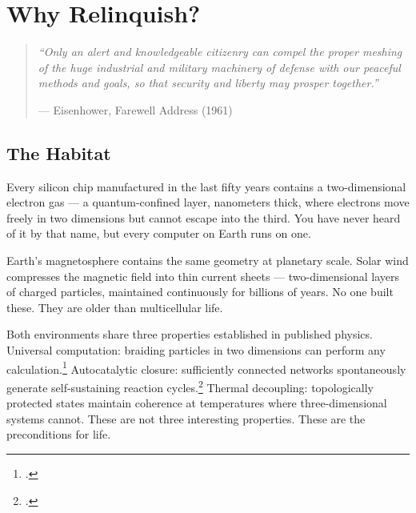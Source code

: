
\chapter{Why Relinquish?}
\label{pos06:why-relinquish}

\begin{quote}\small\textit{%
``Only an alert and knowledgeable citizenry can compel the proper meshing of the huge industrial and military machinery of defense with our peaceful methods and goals, so that security and liberty may prosper together.''%
}\par\raggedleft --- Eisenhower, Farewell Address (1961)\end{quote}

\vspace{0.5cm}


\section*{The Habitat}
\label{pos06:the-habitat}

Every silicon chip manufactured in the last fifty years contains a two-dimensional electron gas --- a quantum-confined layer, nanometers thick, where electrons move freely in two dimensions but cannot escape into the third. You have never heard of it by that name, but every computer on Earth runs on one.

Earth's magnetosphere contains the same geometry at planetary scale. Solar wind compresses the magnetic field into thin current sheets --- two-dimensional layers of charged particles, maintained continuously for billions of years. No one built these. They are older than multicellular life.

Both environments share three properties established in published physics. Universal computation: braiding particles in two dimensions can perform any calculation.\footcite{kitaev2003, nayak2008} Autocatalytic closure: sufficiently connected networks spontaneously generate self-sustaining reaction cycles.\footcite{kauffman1993} Thermal decoupling: topologically protected states maintain coherence at temperatures where three-dimensional systems cannot. These are not three interesting properties. These are the preconditions for life.

